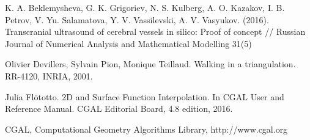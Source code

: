 \documentclass[a4paper]{article}
\numberwithin{equation}{section}
\begin{document}
\begin{thebibliography}{99}
 K. A. Beklemysheva, G. K. Grigoriev, N. S. Kulberg, 
A. O. Kazakov, I. B. Petrov, V. Yu. Salamatova, Y. V. Vassilevski, A. V. Vasyukov. (2016).
Transcranial ultrasound of cerebral vessels in silico: Proof of concept 
// Russian Journal of Numerical Analysis and Mathematical Modelling 31(5)

 Olivier Devillers, Sylvain Pion, Monique Teillaud. 
Walking in a triangulation. RR-4120, INRIA, 2001.

 Julia Flötotto. 
2D and Surface Function Interpolation. 
In CGAL User and Reference Manual. CGAL Editorial Board, 4.8 edition, 2016.

 CGAL, Computational Geometry Algorithms Library, http://www.cgal.org

\end{thebibliography}
\end{document}
